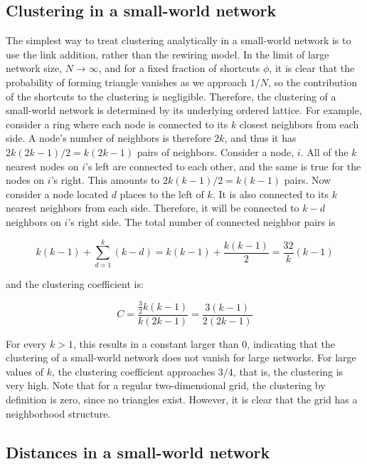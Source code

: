 \subsection{Clustering in a small-world network}

\nd The simplest way to treat clustering analytically in a small-world network is to use the link addition, rather than the rewiring model. In the limit of large network size, $N \to \infty$, and for a fixed fraction of shortcuts $\phi$, it is clear that the probability of forming triangle vanishes as we approach $1/N$, so the contribution of the shortcuts to the clustering is negligible. Therefore, the clustering of a small-world network is determined by its underlying ordered lattice. For example, consider a ring where each node is connected to its $k$ closest neighbors from each side. A node's number of neighbors is therefore $2k$, and thus it has $2k(2k - 1)/2 = k(2k - 1)$ pairs of neighbors. Consider a node, $i$. All of the $k$ nearest nodes on $i$'s left are connected to each other, and the same is true for the nodes on $i$'s right. This amounts to $2k(k - 1)/2 = k(k - 1)$ pairs. Now consider a node located $d$ places to the left of $k$. It is also connected to its $k$ nearest neighbors from each side. Therefore, it will be connected to $k - d$ neighbors on $i$'s right side. The total number of connected neighbor pairs is

\begin{equation}
    k(k-1) + \sum_{d=1}^k (k-d) = k(k-1) + \frac{k(k-1)}{2} = \frac{{3}{2}} k (k-1)
\end{equation}

\nd and the clustering coefficient is:

\begin{equation}
    C = \frac{\frac{3}{2}k(k-1)}{k(2k-1)} =\frac{3 (k-1)}{2(2k-1)}
\end{equation}

\nd For every $k > 1$, this results in a constant larger than $0$, indicating that the clustering of a small-world network does not vanish for large networks. For large values of $k$, the clustering coefficient approaches $3/4$, that is, the clustering is very high. Note that for a regular two-dimensional grid, the  clustering by definition is zero, since no triangles exist. However, it is clear that the grid has a neighborhood structure.

\subsection{Distances in a small-world network}

